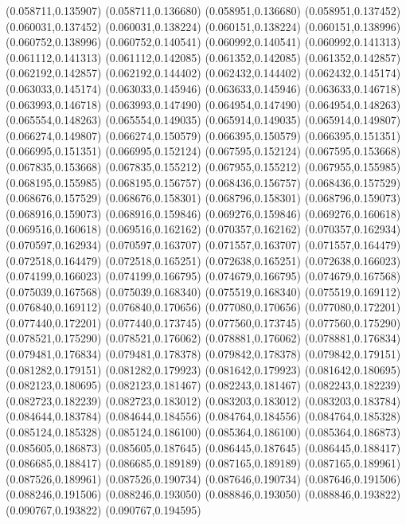 (0.058711,0.135907)
(0.058711,0.136680)
(0.058951,0.136680)
(0.058951,0.137452)
(0.060031,0.137452)
(0.060031,0.138224)
(0.060151,0.138224)
(0.060151,0.138996)
(0.060752,0.138996)
(0.060752,0.140541)
(0.060992,0.140541)
(0.060992,0.141313)
(0.061112,0.141313)
(0.061112,0.142085)
(0.061352,0.142085)
(0.061352,0.142857)
(0.062192,0.142857)
(0.062192,0.144402)
(0.062432,0.144402)
(0.062432,0.145174)
(0.063033,0.145174)
(0.063033,0.145946)
(0.063633,0.145946)
(0.063633,0.146718)
(0.063993,0.146718)
(0.063993,0.147490)
(0.064954,0.147490)
(0.064954,0.148263)
(0.065554,0.148263)
(0.065554,0.149035)
(0.065914,0.149035)
(0.065914,0.149807)
(0.066274,0.149807)
(0.066274,0.150579)
(0.066395,0.150579)
(0.066395,0.151351)
(0.066995,0.151351)
(0.066995,0.152124)
(0.067595,0.152124)
(0.067595,0.153668)
(0.067835,0.153668)
(0.067835,0.155212)
(0.067955,0.155212)
(0.067955,0.155985)
(0.068195,0.155985)
(0.068195,0.156757)
(0.068436,0.156757)
(0.068436,0.157529)
(0.068676,0.157529)
(0.068676,0.158301)
(0.068796,0.158301)
(0.068796,0.159073)
(0.068916,0.159073)
(0.068916,0.159846)
(0.069276,0.159846)
(0.069276,0.160618)
(0.069516,0.160618)
(0.069516,0.162162)
(0.070357,0.162162)
(0.070357,0.162934)
(0.070597,0.162934)
(0.070597,0.163707)
(0.071557,0.163707)
(0.071557,0.164479)
(0.072518,0.164479)
(0.072518,0.165251)
(0.072638,0.165251)
(0.072638,0.166023)
(0.074199,0.166023)
(0.074199,0.166795)
(0.074679,0.166795)
(0.074679,0.167568)
(0.075039,0.167568)
(0.075039,0.168340)
(0.075519,0.168340)
(0.075519,0.169112)
(0.076840,0.169112)
(0.076840,0.170656)
(0.077080,0.170656)
(0.077080,0.172201)
(0.077440,0.172201)
(0.077440,0.173745)
(0.077560,0.173745)
(0.077560,0.175290)
(0.078521,0.175290)
(0.078521,0.176062)
(0.078881,0.176062)
(0.078881,0.176834)
(0.079481,0.176834)
(0.079481,0.178378)
(0.079842,0.178378)
(0.079842,0.179151)
(0.081282,0.179151)
(0.081282,0.179923)
(0.081642,0.179923)
(0.081642,0.180695)
(0.082123,0.180695)
(0.082123,0.181467)
(0.082243,0.181467)
(0.082243,0.182239)
(0.082723,0.182239)
(0.082723,0.183012)
(0.083203,0.183012)
(0.083203,0.183784)
(0.084644,0.183784)
(0.084644,0.184556)
(0.084764,0.184556)
(0.084764,0.185328)
(0.085124,0.185328)
(0.085124,0.186100)
(0.085364,0.186100)
(0.085364,0.186873)
(0.085605,0.186873)
(0.085605,0.187645)
(0.086445,0.187645)
(0.086445,0.188417)
(0.086685,0.188417)
(0.086685,0.189189)
(0.087165,0.189189)
(0.087165,0.189961)
(0.087526,0.189961)
(0.087526,0.190734)
(0.087646,0.190734)
(0.087646,0.191506)
(0.088246,0.191506)
(0.088246,0.193050)
(0.088846,0.193050)
(0.088846,0.193822)
(0.090767,0.193822)
(0.090767,0.194595)
